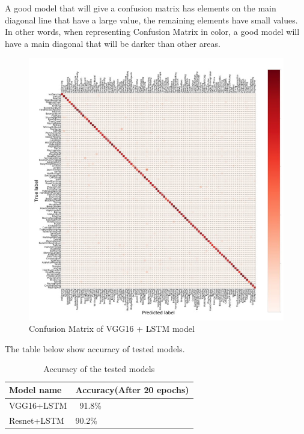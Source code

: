 A good model that will give a confusion matrix has elements on the main diagonal line that have a large value, the remaining elements have small values. In other words, when representing Confusion Matrix in color, a good model will have a main diagonal that will be darker than other areas.
\begin{center}
	\begin{figure}[H]
		\centering
		\includegraphics[width=1\columnwidth]{images/chap3/cfm-2.jpg}
		\caption{Confusion Matrix of VGG16 + LSTM model}
		\label{chap3:cfm-zoom}
	\end{figure}
\end{center}
\vspace{-1cm}
The table below show accuracy of tested models.
\begin{table}[H]
	\begin{tabular}{|P{5cm}|L{5cm}|}
		\hline
		\textbf{Model name}			&  \textbf{Accuracy}(After 20 epochs)
		\\ \hline
		VGG16+LSTM	 	&   ~91.8\%  
		\\ \hline
		Resnet+LSTM 	&  	90.2\%       
		\\ \hline
	\end{tabular}
\caption{Accuracy of the tested models}
\end{table}



